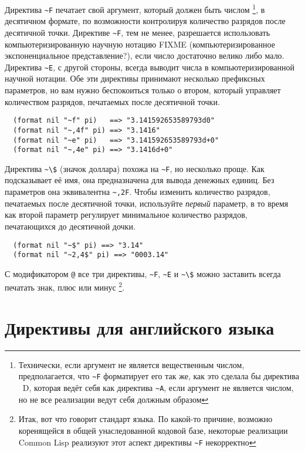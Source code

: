 Директива \lstinline!~F! печатает свой аргумент, который должен быть числом
\footnote{Технически, если аргумент не является вещественным числом, предполагается, что
  \lstinline!~F! форматирует его так же, как это сделала бы директива ~D, которая ведёт
  себя как директива \lstinline!~A!, если аргумент не является числом, но не все
  реализации ведут себя должным образом}, в десятичном формате, по возможности контролируя
количество разрядов после десятичной точки. Директиве \lstinline!~F!, тем не менее,
разрешается использовать компьютеризированную научную нотацию FIXME (компьютеризированное
экспоненциальное представление?), если число достаточно велико либо мало. Директива
\lstinline!~E!, с другой стороны, всегда выводит числа в компьютеризированной научной
нотации. Обе эти директивы принимают несколько префиксных параметров, но вам нужно
беспокоиться только о втором, который управляет количеством разрядов, печатаемых после
десятичной точки.

\begin{verbatim}
  (format nil "~f" pi)   ==> "3.141592653589793d0"
  (format nil "~,4f" pi) ==> "3.1416"
  (format nil "~e" pi)   ==> "3.141592653589793d+0"
  (format nil "~,4e" pi) ==> "3.1416d+0"
\end{verbatim}

Директива \lstinline!~\$! (значок доллара) похожа на \lstinline!~F!, но несколько
проще. Как подсказывает её имя, она предназначена для вывода денежных единиц. Без
параметров она эквивалентна \lstinline!~,2F!. Чтобы изменить количество разрядов,
печатаемых после десятичной точки, используйте \textit{первый} параметр, в то время как
второй параметр регулирует минимальное количество разрядов, печатающихся до десятичной
дочки.

\begin{verbatim}
  (format nil "~$" pi) ==> "3.14"
  (format nil "~2,4$" pi) ==> "0003.14"
\end{verbatim}

С модификатором \lstinline!@! все три директивы, \lstinline!~F!, \lstinline!~E! и
\lstinline!~\$! можно заставить всегда печатать знак, плюс или минус \footnote{Итак, вот
  что говорит стандарт языка. По какой-то причине, возможно коренящейся в общей
  унаследованной кодовой базе, некоторые реализации Common Lisp реализуют этот аспект
  директивы \lstinline!~F! некорректно}.

\section{Директивы для английского языка}

